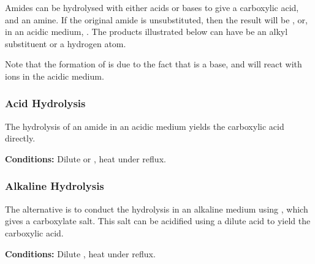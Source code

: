 			Amides can be hydrolysed with either acids or bases to give a carboxylic acid, and an amine. If the original amide is unsubstituted,
			then the result will be , or, in an acidic medium, . The products illustrated below can have  be an alkyl
			substituent or a hydrogen atom.

			Note that the formation of  is due to the fact that  is a base, and will react with  ions in the acidic
			medium.

			\subsubsection{Acid Hydrolysis}

				The hydrolysis of an amide in an acidic medium yields the carboxylic acid directly.

				\vspace{1.5em}
				\vbox{\textbf{Conditions:}	\tabto{35mm}Dilute  or , heat under reflux.}



			\subsubsection{Alkaline Hydrolysis}

				The alternative is to conduct the hydrolysis in an alkaline medium using , which gives a carboxylate salt.
				This salt can be acidified using a dilute acid to yield the carboxylic acid.

				\vspace{1.5em}
				\vbox{\textbf{Conditions:}	\tabto{35mm}Dilute , heat under reflux.}



